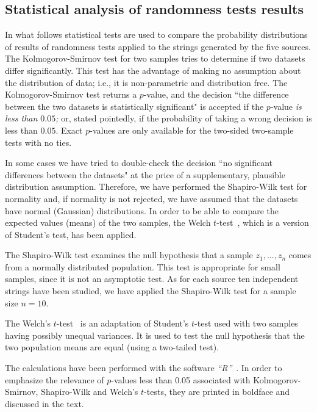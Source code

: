 \documentclass[10pt]{article}%
\begin{document}
\subsection{Statistical analysis of randomness tests results}

In what follows statistical tests are used to compare the probability
distributions of results of randomness tests applied to the strings generated by the
five sources.
The Kolmogorov-Smirnov test  for two samples \cite{Conover}
tries to determine if two datasets differ significantly.
This test
has the advantage of making no assumption about the distribution of data; i.e., it
is non-parametric and distribution free.
The Kolmogorov-Smirnov test returns a $p$-value,
and the decision ``the difference between the two datasets is statistically
significant" is accepted if the $p$-value {\em is less than $0.05$;}
or, stated pointedly, if the
probability of taking a wrong decision is less than $0.05$. Exact $p$-values are
only available for the two-sided two-sample tests with no ties.

In some cases we have tried to double-check the decision  ``no significant
differences between the datasets"  at the price of a supplementary, plausible
distribution assumption. Therefore, we have performed the Shapiro-Wilk test  for normality
\cite{Shapiro-Wilk} and, if normality is not rejected, we have assumed that the
datasets have normal (Gaussian) distributions.
In order to be able to compare the expected values (means) of the two samples,
the Welch $t$-test~\cite{Welch}, which is a version of Student's test, has been applied.

The Shapiro-Wilk test examines the null hypothesis that a sample
$z_{1},\ldots ,z_{n}$ comes from a normally distributed population. This test is
appropriate for small samples, since it is not an asymptotic test.
As for each
source ten independent strings have been studied, we have applied the
Shapiro-Wilk test for a sample size $n = 10$.

The Welch's $t$-test~\cite{Welch} is an adaptation of Student's $t$-test  used
with two samples having possibly unequal variances. It is used to test the
null hypothesis that the two population means are equal (using a two-tailed test).

The calculations
have been performed with the software {\em ``R''}~\cite{rproject}.
In order to emphasize the relevance of $p$-values less than 0.05 associated with Kolmogorov-Smirnov,
Shapiro-Wilk and Welch's $t$-tests, they are printed in boldface and discussed in the text.
\end{document}
